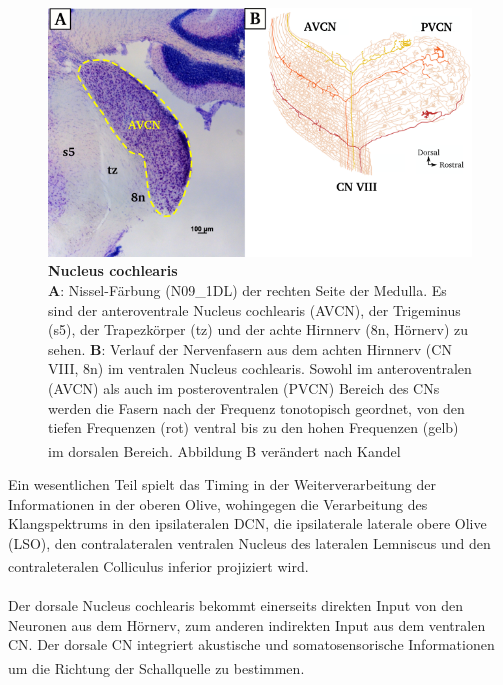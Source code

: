 \documentclass[12pt,a4paper,pdftex]{article}
\begin{document}
\begin{figure}[H]
    \centering
    \includegraphics[width = \textwidth]{pictures/auditory/CN.png}
    \caption[Nucleus cochlearis]{\textbf{Nucleus cochlearis}\\
    \textbf{A}: Nissel-Färbung (N09\_1DL) der rechten Seite der Medulla. Es sind der anteroventrale Nucleus cochlearis (AVCN), der Trigeminus (s5), der Trapezkörper (tz) und der achte Hirnnerv (8n, Hörnerv) zu sehen. \textbf{B}: Verlauf der Nervenfasern aus dem achten Hirnnerv (CN VIII, 8n) im ventralen Nucleus cochlearis. Sowohl im anteroventralen (AVCN) als auch im posteroventralen (PVCN) Bereich des CNs werden die Fasern nach der Frequenz tonotopisch geordnet, von den tiefen Frequenzen (rot) ventral bis zu den hohen Frequenzen (gelb) im dorsalen Bereich. Abbildung B verändert nach Kandel \textsuperscript{\cite[31]{kandel2013principles}}}
    \label{fig:Nucleus_cochlearis}
\end{figure}

\newpage
Ein wesentlichen Teil spielt das Timing in der Weiterverarbeitung der Informationen in der oberen Olive, wohingegen die Verarbeitung des Klangspektrums in den ipsilateralen DCN, die ipsilaterale laterale obere Olive (LSO), den contralateralen ventralen Nucleus des lateralen Lemniscus und den contraleteralen Colliculus inferior projiziert wird\textsuperscript{\cite[31]{kandel2013principles}}. 
\\\\
\noindent Der dorsale Nucleus cochlearis bekommt einerseits direkten Input von den Neuronen aus dem Hörnerv, zum anderen indirekten Input aus dem ventralen CN. Der dorsale CN integriert akustische  und somatosensorische Informationen um die Richtung der Schallquelle zu bestimmen\textsuperscript{\cite[31]{kandel2013principles}}. 
\end{document}
